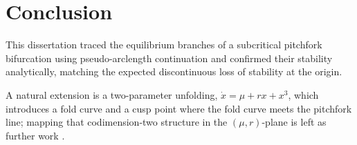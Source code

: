 \chapter{Conclusion}
\label{ch:conclusion}

This dissertation traced the equilibrium branches of a subcritical
pitchfork bifurcation using pseudo-arclength continuation and confirmed
their stability analytically, matching the expected discontinuous loss
of stability at the origin.

A natural extension is a two-parameter unfolding,
$\dot{x} = \mu + rx + x^3$, which introduces a fold curve and a cusp
point where the fold curve meets the pitchfork line; mapping that
codimension-two structure in the $(\mu, r)$-plane is left as further
work \citep{strogatz2015nonlinear}.
